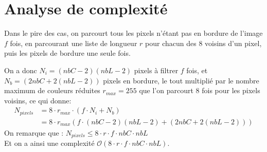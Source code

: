 \documentclass[a4paper, 11pt]{article}
\begin{document}
\section*{Analyse de complexité}
\begin{minipage}{0.5\linewidth}
Dans le pire des cas, on parcourt tous les pixels n'étant pas en bordure de l'image $f$ fois, en parcourant une liste de longueur $r$ pour chacun des 8 voisins d'un pixel, puis les pixels de bordure une seule fois.

On a donc $N_i = (nbC - 2)(nbL-2)$ pixels à filtrer $f$ fois, et $N_b = (2nbC + 2(nbL-2))$ pixels en bordure, le tout multiplié par le nombre maximum de couleurs réduites $r_{max} = 255$ que l'on parcourt 8 fois pour les pixels voisins, ce qui donne:
\begin{align}
N_{pixels} &= 8 \cdot r_{max} \cdot (f \cdot N_i + N_b ) \nonumber \\
&= 8 \cdot r_{max}  (f \cdot (nbC - 2)(nbL-2) + (2nbC + 2(nbL-2))) \nonumber
\end{align}
On remarque que : $N_{pixels} \leq 8\cdot r\cdot f\cdot nbC\cdot nbL$\\

Et on a ainsi une complexité $\mathcal{O}(8\cdot r\cdot f\cdot nbC\cdot nbL)$.
\end{minipage}\hfil
\end{document}

